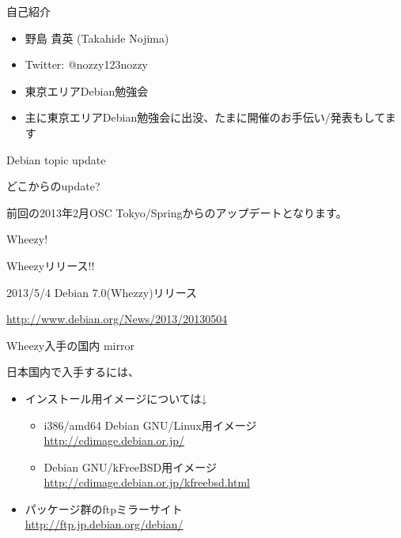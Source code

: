 \begin{frame}{自己紹介}
\begin{itemize}
\item 野島 貴英 (Takahide Nojima)
\item Twitter: @nozzy123nozzy
\item 東京エリアDebian勉強会
\item 主に東京エリアDebian勉強会に出没、たまに開催のお手伝い/発表もしてます
\end{itemize}
\end{frame}

\begin{frame}
\begin{center}
\LARGE{Debian topic update}
\end{center}
\end{frame}

\begin{frame}{どこからのupdate?}
\begin{center}
\Large{前回の2013年2月OSC Tokyo/Springからのアップデートとなります。}
\end{center}
\end{frame}


\begin{frame}

\begin{center}
\LARGE
Wheezy!
\end{center}

\end{frame}


\begin{frame}{Wheezyリリース!!}

\begin{center}
\LARGE
2013/5/4 Debian 7.0(Whezzy)リリース
\end{center}
\url{http://www.debian.org/News/2013/20130504}
\end{frame}


\begin{frame}{Wheezy入手の国内 mirror}

日本国内で入手するには、

\begin{itemize}
\item インストール用イメージについては↓\\
  \begin{itemize}
  \item {i386/amd64 Debian GNU/Linux用イメージ} \\
    \url{http://cdimage.debian.or.jp/}
  \item {Debian GNU/kFreeBSD用イメージ} \\
    \url{http://cdimage.debian.or.jp/kfreebsd.html}
  \end{itemize}
\item パッケージ群のftpミラーサイト\\
  \url{http://ftp.jp.debian.org/debian/}
\end{itemize}  
\end{frame}

